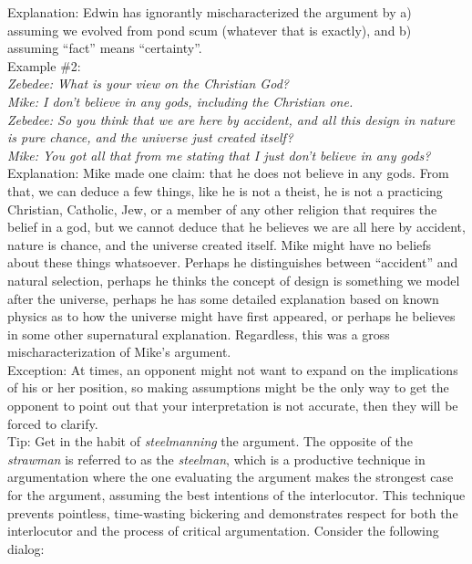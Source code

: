 \documentclass[a4paper,12pt,single,pdftex]{scrartcl}
\begin{document}
    
      Explanation: Edwin has ignorantly mischaracterized the argument by a) assuming we evolved from pond scum (whatever that is exactly), and b) assuming “fact” means “certainty”.
    \\

    
      Example \#2:
    \\

    
      {\em Zebedee: What is your view on the Christian God?}
    \\

    
      {\em Mike: I don’t believe in any gods, including the Christian one.}
    \\

    
      {\em Zebedee: So you think that we are here by accident, and all this design in nature is pure chance, and the universe just created itself?}
    \\

    
      {\em Mike: You got all that from me stating that I just don’t believe in any gods?}
    \\

    
      Explanation: Mike made one claim: that he does not believe in any gods.  From that, we can deduce a few things, like he is not a theist, he is not a practicing Christian, Catholic, Jew, or a member of any other religion that requires the belief in a god, but we cannot deduce that he believes we are all here by accident, nature is chance, and the universe created itself.  Mike might have no beliefs about these things whatsoever.  Perhaps he distinguishes between “accident” and natural selection, perhaps he thinks the concept of design is something we model after the universe, perhaps he has some detailed explanation based on known physics as to how the universe might have first appeared, or perhaps he believes in some other supernatural explanation.  Regardless, this was a gross mischaracterization of Mike’s argument.
    \\

    
      Exception: At times, an opponent might not want to expand on the implications of his or her position, so making assumptions might be the only way to get the opponent to point out that your interpretation is not accurate, then they will be forced to clarify.
    \\

    
      Tip: Get in the habit of {\em steelmanning} the argument. The opposite of the {\em strawman} is referred to as the {\em steelman}, which is a productive technique in argumentation where the one evaluating the argument makes the strongest case for the argument, assuming the best intentions of the interlocutor. This technique prevents pointless, time-wasting bickering and demonstrates respect for both the interlocutor and the process of critical argumentation. Consider the following dialog:
    \\
\end{document}
